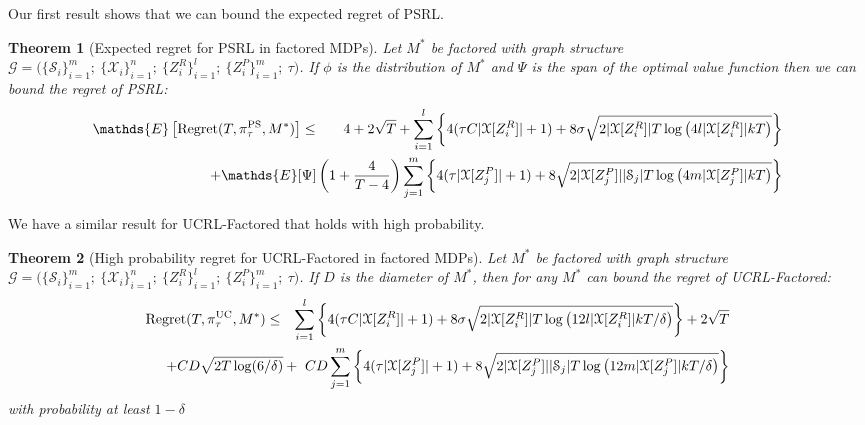 \documentclass{article}
\newtheorem{theorem}{Theorem}
\newcommand{\Exp}{\mathds{E}}
\newcommand{\Xc}{\mathcal{X}}
\newcommand{\Gc}{\mathcal{G}}
\newcommand{\Sc}{\mathcal{S}}
\begin{document}
Our first result shows that we can bound the expected regret of PSRL.

\begin{theorem}[Expected regret for PSRL in factored MDPs]
\label{thm: reg PSRL}  \hspace{0.000000001mm} \newline
Let $M^*$ be factored with graph structure $\Gc  = \big( \{ \Sc_i \}_{i=1}^m ; \  \{ \Xc_i \}_{i=1}^n ; \   \{ Z^R_i \}_{i=1}^l;\  \{ Z^P_i \}_{i=1}^m;\  \tau \big)$. 
If $\phi$ is the distribution of $M^*$ and $\Psi$ is the span of the optimal value function then we can bound the regret of PSRL:
\begin{eqnarray}
	\Exp \left[\mathrm{Regret}(T, \pi^{\rm PS}_{\tau}, M^*) \right] &\le& 4 +2 \sqrt{T} +
		\sum_{i=1}^l \left\{ 4(\tau C |\Xc[Z^R_i]| + 1) + 8\sigma\sqrt{2 | \Xc[Z^R_i]| T \log\left(4 l | \Xc[Z^R_i] | k T\right)} \right\} \nonumber \\ 
	&& \hspace{-30mm} + \Exp[\Psi] \left( 1 + \frac{4}{T-4} \right) \sum_{j=1}^m \left\{ 4(\tau |\Xc[Z^P_j]| + 1) + 8\sqrt{2 | \Xc[Z^P_j]| |\Sc_j |   T \log\left(4 m | \Xc[Z^P_j] | k T\right)} \right\}
\end{eqnarray}
\end{theorem}

We have a similar result for UCRL-Factored that holds with high probability.
\begin{theorem}[High probability regret for UCRL-Factored in factored MDPs]
\label{thm: reg UCRL-Factored}  \hspace{0.000000001mm} \newline
Let $M^*$ be factored with graph structure $\Gc  = \big( \{ \Sc_i \}_{i=1}^m ; \  \{ \Xc_i \}_{i=1}^n ; \   \{ Z^R_i \}_{i=1}^l;\  \{ Z^P_i \}_{i=1}^m;\  \tau \big)$. 
If $D$ is the diameter of $M^*$, then for any $M^*$ can bound the regret of UCRL-Factored:
\begin{eqnarray}
	\mathrm{Regret}(T, \pi^{\rm UC}_{\tau}, M^*) &\le& \sum_{i=1}^l \left\{ 4(\tau C |\Xc[Z^R_i]| + 1) + 8\sigma\sqrt{2 | \Xc[Z^R_i]| T \log\left(12 l | \Xc[Z^R_i] | k T / \delta\right)}  \right\} \nonumber + 2\sqrt{T}\\ 
	&& \hspace{-37mm} + CD\sqrt{2T \log(6/\delta)}  + \  CD \sum_{j=1}^m \left\{ 4(\tau |\Xc[Z^P_j]| + 1) + 8\sqrt{2 | \Xc[Z^P_j]| |\Sc_j |   T \log\left(12 m | \Xc[Z^P_j] | k T / \delta \right)} \right\}
\end{eqnarray}
\normalsize
with probability at least $1-\delta$
\end{theorem}
\end{document}
